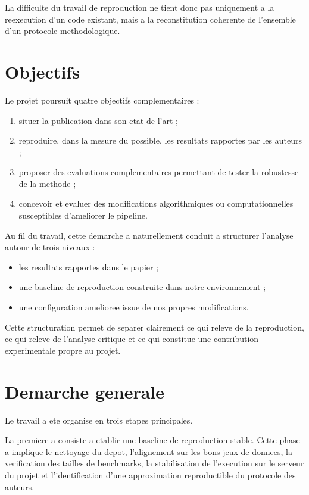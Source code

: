 La difficulte du travail de reproduction ne tient donc pas uniquement a la
reexecution d'un code existant, mais a la reconstitution coherente de
l'ensemble d'un protocole methodologique.

\section{Objectifs}

Le projet poursuit quatre objectifs complementaires :
\begin{enumerate}[leftmargin=*]
  \item situer la publication dans son etat de l'art ;
  \item reproduire, dans la mesure du possible, les resultats rapportes par les
  auteurs ;
  \item proposer des evaluations complementaires permettant de tester la
  robustesse de la methode ;
  \item concevoir et evaluer des modifications algorithmiques ou
  computationnelles susceptibles d'ameliorer le pipeline.
\end{enumerate}

Au fil du travail, cette demarche a naturellement conduit a structurer
l'analyse autour de trois niveaux :
\begin{itemize}[leftmargin=*]
  \item les resultats rapportes dans le papier ;
  \item une baseline de reproduction construite dans notre environnement ;
  \item une configuration amelioree issue de nos propres modifications.
\end{itemize}

Cette structuration permet de separer clairement ce qui releve de la
reproduction, ce qui releve de l'analyse critique et ce qui constitue une
contribution experimentale propre au projet.

\section{Demarche generale}

Le travail a ete organise en trois etapes principales.

La premiere a consiste a etablir une baseline de reproduction stable. Cette
phase a implique le nettoyage du depot, l'alignement sur les bons jeux de
donnees, la verification des tailles de benchmarks, la stabilisation de
l'execution sur le serveur du projet et l'identification d'une approximation
reproductible du protocole des auteurs.

